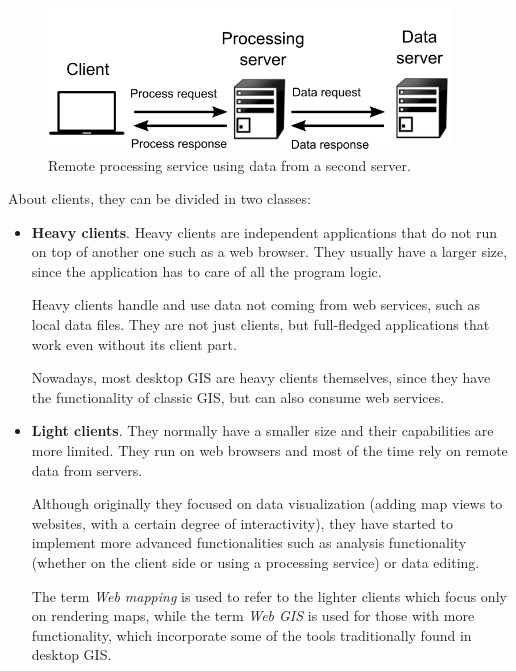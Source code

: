 \begin{itemize}
\begin{figure}[!hbt]   
\centering
\includegraphics[width=0.95\textwidth]{Software/Remote_data_and_services.png}
\caption{\small Remote processing service using data from a second server.}
\label{Fig:Remote_data_and_services} 
\end{figure}

\end{itemize}

About clients, they can be divided in two classes:

\begin{itemize}

	\item \textbf{Heavy clients}. Heavy clients are independent applications that do not run on top of another one such as a web browser. They usually have a larger size, since the application has to care of all the program logic.

	Heavy clients handle and use data not coming from web services, such as local data files. They are not just clients, but full-fledged applications that work even without its client part.

	Nowadays, most desktop GIS are heavy clients themselves, since they have the functionality of classic GIS, but can also consume web services.


	\item \textbf{Light clients}. They normally have a smaller size and their capabilities are more limited. They run on web browsers and most of the time rely on remote data from servers.

	Although originally they focused on data visualization (adding map views to websites, with a certain degree of interactivity), they have started to implement more advanced functionalities such as analysis functionality (whether on the client side or using a processing service) or data editing.

	The term \emph{Web mapping} is used to refer to the lighter clients which focus only on rendering maps, while the term \emph{Web GIS} is used for those with more functionality, which incorporate some of the tools traditionally found in desktop GIS.
\end{itemize}

